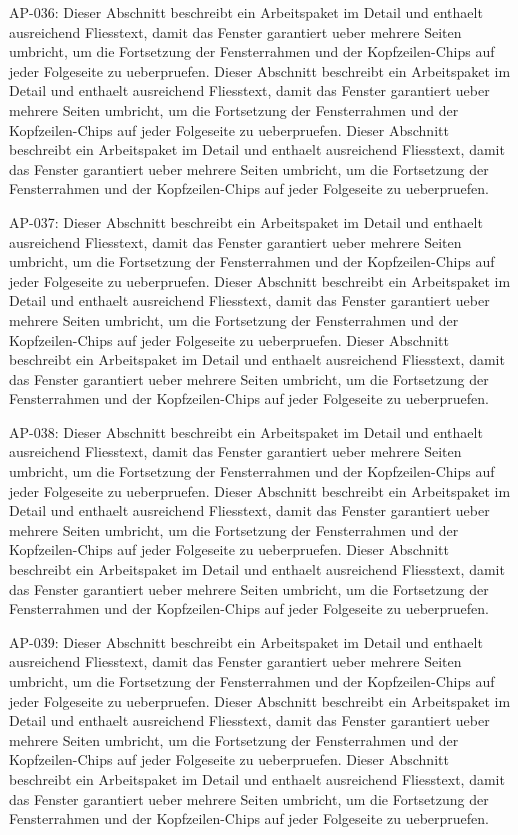 \documentclass[type=report,theme=light,language=de]{semio}
\begin{document}
\begin{Table}[title=Lange Tabelle]
AP-036: Dieser Abschnitt beschreibt ein Arbeitspaket im Detail und enthaelt ausreichend Fliesstext, damit das Fenster garantiert ueber mehrere Seiten umbricht, um die Fortsetzung der Fensterrahmen und der Kopfzeilen-Chips auf jeder Folgeseite zu ueberpruefen. Dieser Abschnitt beschreibt ein Arbeitspaket im Detail und enthaelt ausreichend Fliesstext, damit das Fenster garantiert ueber mehrere Seiten umbricht, um die Fortsetzung der Fensterrahmen und der Kopfzeilen-Chips auf jeder Folgeseite zu ueberpruefen. Dieser Abschnitt beschreibt ein Arbeitspaket im Detail und enthaelt ausreichend Fliesstext, damit das Fenster garantiert ueber mehrere Seiten umbricht, um die Fortsetzung der Fensterrahmen und der Kopfzeilen-Chips auf jeder Folgeseite zu ueberpruefen. 

AP-037: Dieser Abschnitt beschreibt ein Arbeitspaket im Detail und enthaelt ausreichend Fliesstext, damit das Fenster garantiert ueber mehrere Seiten umbricht, um die Fortsetzung der Fensterrahmen und der Kopfzeilen-Chips auf jeder Folgeseite zu ueberpruefen. Dieser Abschnitt beschreibt ein Arbeitspaket im Detail und enthaelt ausreichend Fliesstext, damit das Fenster garantiert ueber mehrere Seiten umbricht, um die Fortsetzung der Fensterrahmen und der Kopfzeilen-Chips auf jeder Folgeseite zu ueberpruefen. Dieser Abschnitt beschreibt ein Arbeitspaket im Detail und enthaelt ausreichend Fliesstext, damit das Fenster garantiert ueber mehrere Seiten umbricht, um die Fortsetzung der Fensterrahmen und der Kopfzeilen-Chips auf jeder Folgeseite zu ueberpruefen. 

AP-038: Dieser Abschnitt beschreibt ein Arbeitspaket im Detail und enthaelt ausreichend Fliesstext, damit das Fenster garantiert ueber mehrere Seiten umbricht, um die Fortsetzung der Fensterrahmen und der Kopfzeilen-Chips auf jeder Folgeseite zu ueberpruefen. Dieser Abschnitt beschreibt ein Arbeitspaket im Detail und enthaelt ausreichend Fliesstext, damit das Fenster garantiert ueber mehrere Seiten umbricht, um die Fortsetzung der Fensterrahmen und der Kopfzeilen-Chips auf jeder Folgeseite zu ueberpruefen. Dieser Abschnitt beschreibt ein Arbeitspaket im Detail und enthaelt ausreichend Fliesstext, damit das Fenster garantiert ueber mehrere Seiten umbricht, um die Fortsetzung der Fensterrahmen und der Kopfzeilen-Chips auf jeder Folgeseite zu ueberpruefen. 

AP-039: Dieser Abschnitt beschreibt ein Arbeitspaket im Detail und enthaelt ausreichend Fliesstext, damit das Fenster garantiert ueber mehrere Seiten umbricht, um die Fortsetzung der Fensterrahmen und der Kopfzeilen-Chips auf jeder Folgeseite zu ueberpruefen. Dieser Abschnitt beschreibt ein Arbeitspaket im Detail und enthaelt ausreichend Fliesstext, damit das Fenster garantiert ueber mehrere Seiten umbricht, um die Fortsetzung der Fensterrahmen und der Kopfzeilen-Chips auf jeder Folgeseite zu ueberpruefen. Dieser Abschnitt beschreibt ein Arbeitspaket im Detail und enthaelt ausreichend Fliesstext, damit das Fenster garantiert ueber mehrere Seiten umbricht, um die Fortsetzung der Fensterrahmen und der Kopfzeilen-Chips auf jeder Folgeseite zu ueberpruefen. 


\end{Table}
\end{document}
